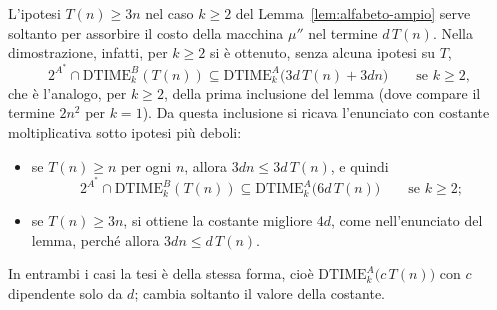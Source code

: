 \begin{rema}\label{rem: indebolimento T geq 3n}
L'ipotesi $T(n)\ge 3n$ nel caso $k\ge 2$ del Lemma~\ref{lem:alfabeto-ampio} serve
soltanto per assorbire il costo della macchina $\mu''$ nel termine $d\,T(n)$.
Nella dimostrazione, infatti, per $k\ge 2$ si è ottenuto, senza alcuna ipotesi su $T$,
\[
2^{A^*} \cap \mathrm{DTIME}^B_k(T(n)) \subseteq \mathrm{DTIME}^A_k\big(3d\,T(n) + 3dn\big)
\qquad \text{se } k \geq 2,
\]
che è l'analogo, per $k\ge 2$, della prima inclusione del lemma (dove compare il
termine $2n^2$ per $k=1$). Da questa inclusione si ricava l'enunciato con costante
moltiplicativa sotto ipotesi più deboli:
\begin{itemize}
  \item se $T(n)\ge n$ per ogni $n$, allora $3dn \le 3d\,T(n)$, e quindi
  \[
  2^{A^*} \cap \mathrm{DTIME}^B_k(T(n)) \subseteq \mathrm{DTIME}^A_k\big(6d\,T(n)\big)
  \qquad \text{se } k \geq 2;
  \]
  \item se $T(n)\ge 3n$, si ottiene la costante migliore $4d$, come nell'enunciato
  del lemma, perché allora $3dn \le d\,T(n)$.
\end{itemize}
In entrambi i casi la tesi è della stessa forma, cioè
$\mathrm{DTIME}^A_k\big(c\,T(n)\big)$ con $c$ dipendente solo da $d$; cambia soltanto
il valore della costante.
\end{rema}

